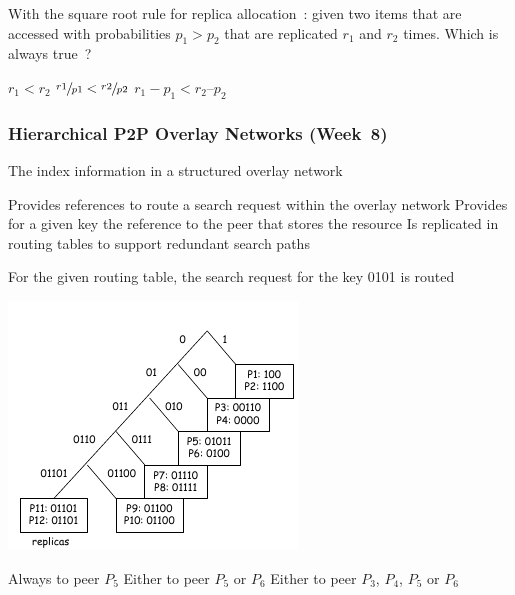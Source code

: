 \documentclass[12pt,a4paper]{exam} %
\begin{document}
\begin{flushleft}
\begin{multicols*}{2}
\begin{questions}
\question With the square root rule for replica allocation~: given two items that are accessed with probabilities $p_1 > p_2$ that are replicated $r_1$ and $r_2$ times. Which is always true~?
\begin{checkboxes}
\choice $r_1 < r_2$
\CorrectChoice $\sfrac{r1}{p1} < \sfrac{r2}{p2}$
\choice $r_1 - p_1 < r_2 – p_2$
\end{checkboxes}



\subsubsection{Hierarchical P2P Overlay Networks (Week~8)}

\question The index information in a structured overlay network
\begin{checkboxes}
\CorrectChoice Provides references to route a search request within the overlay network
\choice Provides for a given key the reference to the peer that stores the resource
\choice Is replicated in routing tables to support redundant search paths
\end{checkboxes}

\question For the given routing table, the search request for the key 0101 is routed
\begin{colfig}
\centering
\includegraphics[scale=0.75]{w8_s14}
\end{colfig}

\begin{checkboxes}
\CorrectChoice Always to peer $P_5$
\choice Either to peer $P_5$ or $P_6$
\choice Either to peer $P_3$, $P_4$, $P_5$ or $P_6$
\end{checkboxes}


\end{questions}
\end{multicols*}
\end{flushleft}
\end{document}
